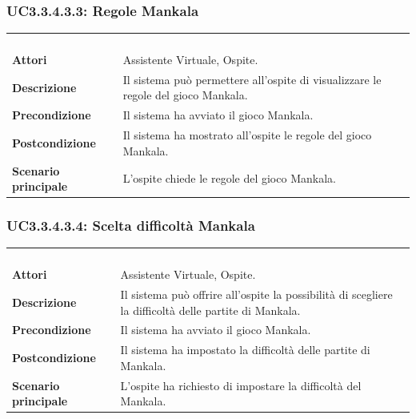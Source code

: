 \subsubsection{UC3.3.4.3.3: Regole Mankala}
\label{UC3.3.4.3.3}
\begin{longtable}{l|p{10cm}}
\rowcolor[gray]{0.8} \multicolumn{2}{c}{} \\
\rowcolor[gray]{0.8} \multicolumn{2}{c}{\textbf{UC3.3.4.3.3 - Regole Mankala}} \\
\rowcolor[gray]{0.8} \multicolumn{2}{c}{} \\
\hline
&\\
\textbf{Attori} & Assistente Virtuale, Ospite.\\[7pt]
\textbf{Descrizione} & Il sistema può permettere all'ospite di visualizzare le regole del gioco Mankala.\\[7pt]
\textbf{Precondizione} & Il sistema ha avviato il gioco Mankala.\\[7pt]
\textbf{Postcondizione} & Il sistema ha mostrato all'ospite le regole del gioco Mankala.\\[7pt]
\textbf{Scenario principale} &L'ospite chiede le regole del gioco Mankala.\\[7pt]\hline
\end{longtable}

\subsubsection{UC3.3.4.3.4: Scelta difficoltà Mankala}
\label{UC3.3.4.3.4}
\begin{longtable}{l|p{10cm}}
\rowcolor[gray]{0.8} \multicolumn{2}{c}{} \\
\rowcolor[gray]{0.8} \multicolumn{2}{c}{\textbf{UC3.3.4.3.4 - Scelta difficoltà Mankala}} \\
\rowcolor[gray]{0.8} \multicolumn{2}{c}{} \\
\hline
&\\
\textbf{Attori} & Assistente Virtuale, Ospite.\\[7pt]
\textbf{Descrizione} & Il sistema può offrire all'ospite la possibilità di scegliere la difficoltà delle partite di Mankala.\\[7pt]
\textbf{Precondizione} & Il sistema ha avviato il gioco Mankala.\\[7pt]
\textbf{Postcondizione} & Il sistema ha impostato la difficoltà delle partite di Mankala.\\[7pt]
\textbf{Scenario principale} &L'ospite ha richiesto di impostare la difficoltà del Mankala.\\[7pt]\hline
\end{longtable}

